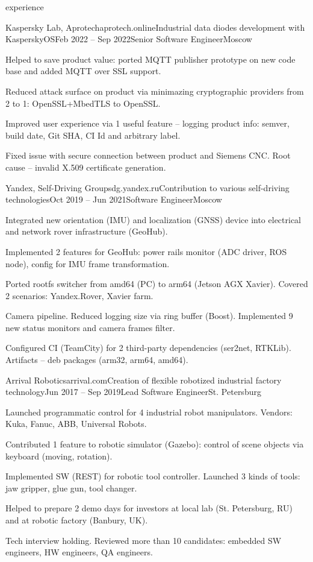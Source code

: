 \documentclass{Vladimir.Ivanov.CV}
\begin{document}
\begin{rSection}{experience}
\begin{rCompany}{Kaspersky Lab, Aprotech}{aprotech.online}{Industrial data diodes development with KasperskyOS}{Feb 2022 -- Sep 2022}{Senior Software Engineer}{Moscow}

\item Helped to save product value: ported MQTT publisher prototype on new code base and added MQTT over SSL support.
\item Reduced attack surface on product via minimazing cryptographic providers from 2 to 1: OpenSSL+MbedTLS to OpenSSL.
\item Improved user experience via 1 useful feature -- logging product info: semver, build date, Git SHA, CI Id and arbitrary label.
\item Fixed issue with secure connection between product and Siemens CNC. Root cause -- invalid X.509 certificate generation.

\end{rCompany}
\begin{rCompany}{Yandex, Self-Driving Group}{sdg.yandex.ru}{Contribution to various self-driving technologies}{Oct 2019 -- Jun 2021}{Software Engineer}{Moscow}

\item Integrated new orientation (IMU) and localization (GNSS) device into electrical and network rover infrastructure (GeoHub).
\item Implemented 2 features for GeoHub: power rails monitor (ADC driver, ROS node), config for IMU frame transformation.
\item Ported rootfs switcher from amd64 (PC) to arm64 (Jetson AGX Xavier). Covered 2 scenarios: Yandex.Rover, Xavier farm.
\item Camera pipeline. Reduced logging size via ring buffer (Boost). Implemented 9 new status monitors and camera frames filter.
\item Configured CI (TeamCity) for 2 third-party dependencies (ser2net, RTKLib). Artifacts -- deb packages (arm32, arm64, amd64).

\end{rCompany}
\begin{rCompany}{Arrival Robotics}{arrival.com}{Creation of flexible robotized industrial factory technology}{Jun 2017 -- Sep 2019}{Lead Software Engineer}{St. Petersburg}

\item Launched programmatic control for 4 industrial robot manipulators. Vendors: Kuka, Fanuc, ABB, Universal Robots.
\item Contributed 1 feature to robotic simulator (Gazebo): control of scene objects via keyboard (moving, rotation).
\item Implemented SW (REST) for robotic tool controller. Launched 3 kinds of tools: jaw gripper, glue gun, tool changer.
\item Helped to prepare 2 demo days for investors at local lab (St. Petersburg, RU) and at robotic factory (Banbury, UK).
\item Tech interview holding. Reviewed more than 10 candidates: embedded SW engineers, HW engineers, QA engineers.


\end{rCompany}
\end{rSection}
\end{document}
